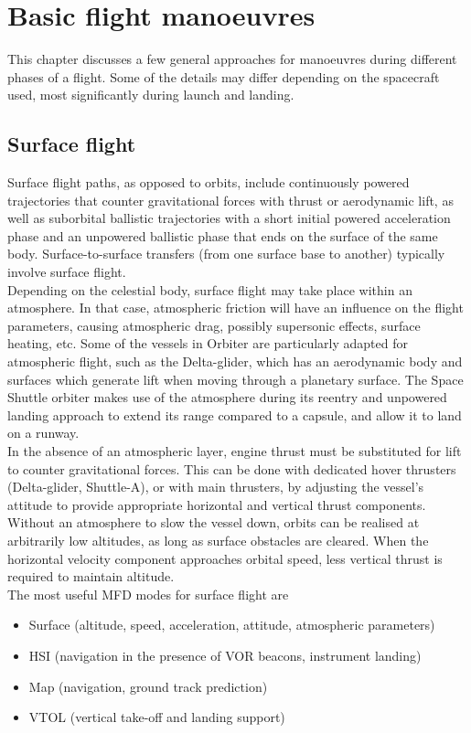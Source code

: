 \documentclass[Orbiter User Manual.tex]{subfiles}
\begin{document}
\section{Basic flight manoeuvres}
\label{sec:basic_flight}
This chapter discusses a few general approaches for manoeuvres during different phases of a flight. Some of the details may differ depending on the spacecraft used, most significantly during launch and landing.


\subsection{Surface flight}
Surface flight paths, as opposed to orbits, include continuously powered trajectories that counter gravitational forces with thrust or aerodynamic lift, as well as suborbital ballistic trajectories with a short initial powered acceleration phase and an unpowered ballistic phase that ends on the surface of the same body. Surface-to-surface transfers (from one surface base to another) typically involve surface flight.\\
Depending on the celestial body, surface flight may take place within an atmosphere. In that case, atmospheric friction will have an influence on the flight parameters, causing atmospheric drag, possibly supersonic effects, surface heating, etc. Some of the vessels in Orbiter are particularly adapted for atmospheric flight, such as the Delta-glider, which has an aerodynamic body and surfaces which generate lift when moving through a planetary surface. The Space Shuttle orbiter makes use of the atmosphere during its reentry and unpowered landing approach to extend its range compared to a capsule, and allow it to land on a runway.\\
In the absence of an atmospheric layer, engine thrust must be substituted for lift to counter gravitational forces. This can be done with dedicated hover thrusters (Delta-glider, Shuttle-A), or with main thrusters, by adjusting the vessel's attitude to provide appropriate horizontal and vertical thrust components. Without an atmosphere to slow the vessel down, orbits can be realised at arbitrarily low altitudes, as long as surface obstacles are cleared. When the horizontal velocity component approaches orbital speed, less vertical thrust is required to maintain altitude.\\
The most useful MFD modes for surface flight are

\begin{itemize}
\item Surface (altitude, speed, acceleration, attitude, atmospheric parameters)
\item HSI (navigation in the presence of VOR beacons, instrument landing)
\item Map (navigation, ground track prediction)
\item VTOL (vertical take-off and landing support)
\end{itemize}
\end{document}
